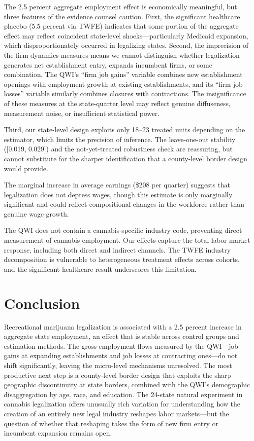 \documentclass[12pt]{article}
\begin{document}
The 2.5 percent aggregate employment effect is economically meaningful, but three features of the evidence counsel caution. First, the significant healthcare placebo (5.5 percent via TWFE) indicates that some portion of the aggregate effect may reflect coincident state-level shocks---particularly Medicaid expansion, which disproportionately occurred in legalizing states. Second, the imprecision of the firm-dynamics measures means we cannot distinguish whether legalization generates net establishment entry, expands incumbent firms, or some combination. The QWI's ``firm job gains'' variable combines new establishment openings with employment growth at existing establishments, and its ``firm job losses'' variable similarly combines closures with contractions. The insignificance of these measures at the state-quarter level may reflect genuine diffuseness, measurement noise, or insufficient statistical power.

Third, our state-level design exploits only 18--23 treated units depending on the estimator, which limits the precision of inference. The leave-one-out stability ([0.019, 0.029]) and the not-yet-treated robustness check are reassuring, but cannot substitute for the sharper identification that a county-level border design would provide.

The marginal increase in average earnings (\$208 per quarter) suggests that legalization does not depress wages, though this estimate is only marginally significant and could reflect compositional changes in the workforce rather than genuine wage growth.

The QWI does not contain a cannabis-specific industry code, preventing direct measurement of cannabis employment. Our effects capture the total labor market response, including both direct and indirect channels. The TWFE industry decomposition is vulnerable to heterogeneous treatment effects across cohorts, and the significant healthcare result underscores this limitation.

\section{Conclusion}

Recreational marijuana legalization is associated with a 2.5 percent increase in aggregate state employment, an effect that is stable across control groups and estimation methods. The gross employment flows measured by the QWI---job gains at expanding establishments and job losses at contracting ones---do not shift significantly, leaving the micro-level mechanisms unresolved. The most productive next step is a county-level border design that exploits the sharp geographic discontinuity at state borders, combined with the QWI's demographic disaggregation by age, race, and education. The 24-state natural experiment in cannabis legalization offers unusually rich variation for understanding how the creation of an entirely new legal industry reshapes labor markets---but the question of whether that reshaping takes the form of new firm entry or incumbent expansion remains open.
\end{document}
